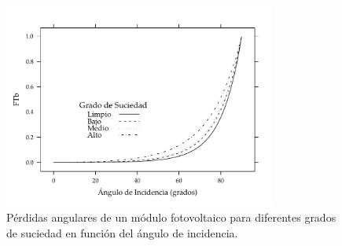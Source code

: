 \begin{figure}[htbp]
\centering
\includegraphics[keepaspectratio,width=0.8\textwidth,height=0.5\textheight]{figuras/Suciedad.pdf}
\caption{\label{fig:org19ffe0a}Pérdidas angulares de un módulo fotovoltaico para diferentes grados de suciedad en función del ángulo de incidencia.}
\end{figure}

